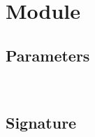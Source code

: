 \section{Module }\label{Oxcaml-F_kind}%
\subsection{Parameters\label{Oxcaml-F_kind--parameters}}%
\label{Oxcaml-F_kind--argument-1-X}\label{Oxcaml-F_kind-argument-1-X}\begin{ocamlindent}\end{ocamlindent}%
\\
\subsection{Signature\label{Oxcaml-F_kind--signature}}%


